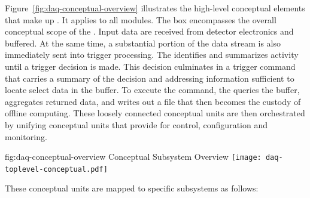 Figure~\ref{fig:daq-conceptual-overview}  illustrates  the high-level conceptual elements that make up   . 
It applies to all  modules. 
The box %
encompasses the overall conceptual scope of the .
Input data are received from detector electronics and buffered. 
At the same time, a substantial portion of the data stream is also immediately sent into trigger processing. 
The  identifies and summarizes activity until a trigger decision is made. 
This decision culminates in a trigger command that carries a summary of the decision and addressing information sufficient to locate select data in the buffer.
To execute the command, the  queries the buffer, aggregates returned data, and writes out a file that then becomes the custody of offline computing.
These loosely connected conceptual units are then orchestrated by unifying conceptual units that provide for control, configuration and monitoring.

\begin{dunefigure}{fig:daq-conceptual-overview}{ Conceptual
    Subsystem Overview}
  \texttt{[image: daq-toplevel-conceptual.pdf]}
\end{dunefigure}

These conceptual units are mapped to specific  subsystems as follows:


